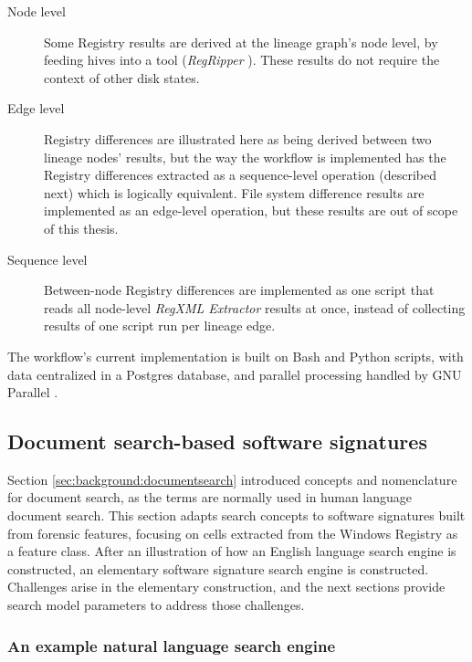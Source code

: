 \documentclass[11pt]{ucthesis}
\theoremstyle{plain}
\theoremstyle{definition}
\newcommand{\Regxmlextractor}{\emph{RegXML Extractor}\xspace}
\begin{document}
\begin{description}
\item[Node level] \par Some Registry results are derived at the lineage graph's node level, by feeding hives into a tool (\emph{RegRipper} \cite{carvey:syngress11}).  These results do not require the context of other disk states.
\item[Edge level] \par Registry differences are illustrated here as being derived between two lineage nodes' results, but the way the workflow is implemented has the Registry differences extracted as a sequence-level operation (described next) which is logically equivalent.  File system difference results are implemented as an edge-level operation, but these results are out of scope of this thesis.
\item[Sequence level] \par Between-node Registry differences are implemented as one script that reads all node-level \Regxmlextractor results at once, instead of collecting results of one script run per lineage edge.
\end{description}

The workflow's current implementation is built on Bash and Python scripts, with data centralized in a Postgres database, and parallel processing handled by GNU Parallel \cite{tange:login11a}.


\subsection{Document search-based software signatures}

Section \ref{sec:background:documentsearch} introduced concepts and nomenclature for document search, as the terms are normally used in human language document search.  This section adapts search concepts to software signatures built from forensic features, focusing on cells extracted from the Windows Registry as a feature class.  After an illustration of how an English language search engine is constructed, an elementary software signature search engine is constructed.  Challenges arise in the elementary construction, and the next sections provide search model parameters to address those challenges.


\subsubsection{An example natural language search engine}
\end{document}
